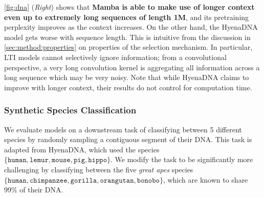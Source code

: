 \cref{fig:dna} (\emph{Right}) shows that \textbf{Mamba is able to make use of longer context even up to extremely long sequences of length 1M}, and its pretraining perplexity improves as the context increases.
On the other hand, the HyenaDNA model gets worse with sequence length.
This is intuitive from the discussion in \cref{sec:method:properties} on properties of the selection mechanism.
In particular, LTI models cannot selectively ignore information;
from a convolutional perspective, a very long convolution kernel is aggregating all information across a long sequence which may be very noisy.
Note that while HyenaDNA claims to improve with longer context, their results do not control for computation time.


\subsubsection{Synthetic Species Classification}

We evaluate models on a downstream task of classifying between 5 different species by randomly sampling a contiguous segment of their DNA.
This task is adapted from HyenaDNA,
which used the species $\{ \texttt{human}, \texttt{lemur}, \texttt{mouse}, \texttt{pig}, \texttt{hippo} \}$.
We modify the task to be significantly more challenging by classifying between the five \emph{great apes} species \\ $\{ \texttt{human}, \texttt{chimpanzee}, \texttt{gorilla}, \texttt{orangutan}, \texttt{bonobo} \}$,
which are known to share 99\% of their DNA.
